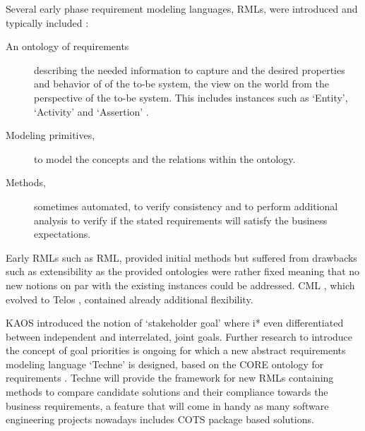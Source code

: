Several early phase requirement modeling languages, RMLs, were introduced and typically included : 
\begin{description}
	\item[An ontology of requirements] describing the needed information to capture and the desired properties and behavior of of the to-be system, the view on the world from the perspective of the to-be system. This includes instances such as `Entity', `Activity' and `Assertion' .
	\item[Modeling primitives,] to model the concepts and the relations within the ontology.
	\item[Methods,] sometimes automated, to verify consistency and to perform additional analysis to verify if the stated requirements will satisfy the business expectations.
\end{description}

Early RMLs such as RML, provided initial methods but suffered from drawbacks such as extensibility as the provided ontologies were rather fixed meaning that no new notions on par with the existing instances could be addressed. CML  , which evolved to Telos , contained already additional flexibility. 

KAOS  introduced the notion of `stakeholder goal' where i*  even differentiated between independent and interrelated, joint goals.
Further research to introduce the concept of goal priorities is ongoing for which a new abstract requirements modeling language `Techne'  is designed, based on the CORE ontology for requirements . Techne will provide the framework for new RMLs containing methods to compare candidate solutions and their compliance towards the business requirements, a feature that will come in handy as many software engineering projects nowadays includes COTS package based solutions.


